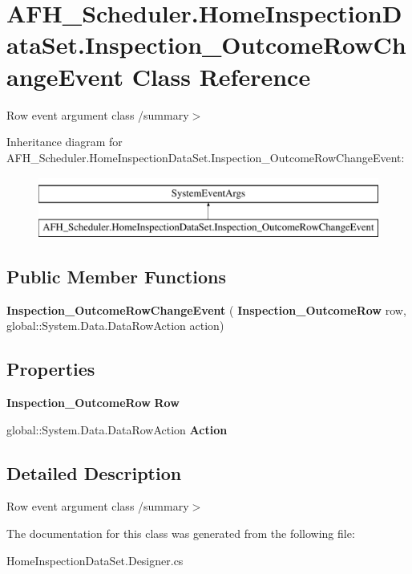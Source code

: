 \section{A\+F\+H\+\_\+\+Scheduler.\+Home\+Inspection\+Data\+Set.\+Inspection\+\_\+\+Outcome\+Row\+Change\+Event Class Reference}
\label{class_a_f_h___scheduler_1_1_home_inspection_data_set_1_1_inspection___outcome_row_change_event}


Row event argument class /summary$>$  


Inheritance diagram for A\+F\+H\+\_\+\+Scheduler.\+Home\+Inspection\+Data\+Set.\+Inspection\+\_\+\+Outcome\+Row\+Change\+Event\+:\begin{figure}[H]
\begin{center}
\leavevmode
\includegraphics[height=2.000000cm]{class_a_f_h___scheduler_1_1_home_inspection_data_set_1_1_inspection___outcome_row_change_event}
\end{center}
\end{figure}
\subsection*{Public Member Functions}
\begin{DoxyCompactItemize}
\item 
\mbox{\label{class_a_f_h___scheduler_1_1_home_inspection_data_set_1_1_inspection___outcome_row_change_event_a80b2a46fd141908bc081cd221c140392}} 
{\bfseries Inspection\+\_\+\+Outcome\+Row\+Change\+Event} (\textbf{ Inspection\+\_\+\+Outcome\+Row} row, global\+::\+System.\+Data.\+Data\+Row\+Action action)
\end{DoxyCompactItemize}
\subsection*{Properties}
\begin{DoxyCompactItemize}
\item 
\mbox{\label{class_a_f_h___scheduler_1_1_home_inspection_data_set_1_1_inspection___outcome_row_change_event_aaa1300da0787e8f8936f5e7b18da70f1}} 
\textbf{ Inspection\+\_\+\+Outcome\+Row} {\bfseries Row}\hspace{0.3cm}{\ttfamily  [get]}
\item 
\mbox{\label{class_a_f_h___scheduler_1_1_home_inspection_data_set_1_1_inspection___outcome_row_change_event_abe492d74a74d2110a0579bd8c7baf984}} 
global\+::\+System.\+Data.\+Data\+Row\+Action {\bfseries Action}\hspace{0.3cm}{\ttfamily  [get]}
\end{DoxyCompactItemize}


\subsection{Detailed Description}
Row event argument class /summary$>$ 

The documentation for this class was generated from the following file\+:\begin{DoxyCompactItemize}
\item 
Home\+Inspection\+Data\+Set.\+Designer.\+cs\end{DoxyCompactItemize}
